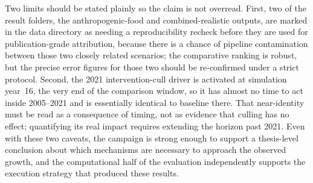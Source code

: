 Two limits should be stated plainly so the claim is not overread. First, two of the result folders, the anthropogenic-food and combined-realistic outputs, are marked in the data directory as needing a reproducibility recheck before they are used for publication-grade attribution, because there is a chance of pipeline contamination between those two closely related scenarios; the comparative ranking is robust, but the precise error figures for those two should be re-confirmed under a strict protocol. Second, the 2021 intervention-cull driver is activated at simulation year~16, the very end of the comparison window, so it has almost no time to act inside 2005--2021 and is essentially identical to baseline there. That near-identity must be read as a consequence of timing, not as evidence that culling has no effect; quantifying its real impact requires extending the horizon past 2021. Even with these two caveats, the campaign is strong enough to support a thesis-level conclusion about which mechanisms are necessary to approach the observed growth, and the computational half of the evaluation independently supports the execution strategy that produced these results.
